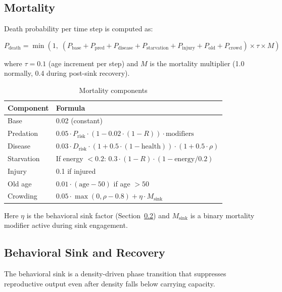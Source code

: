 \subsection{Mortality}
\label{sec:mortality}

Death probability per time step is computed as:

\begin{equation}
P_{\text{death}} = \min\left(1,\; (P_{\text{base}} + P_{\text{pred}} + P_{\text{disease}} + P_{\text{starvation}} + P_{\text{injury}} + P_{\text{old}} + P_{\text{crowd}}) \times \tau \times M\right)
\label{eq:mortality}
\end{equation}

where $\tau = 0.1$ (age increment per step) and $M$ is the mortality multiplier (1.0 normally, 0.4 during post-sink recovery).

\begin{table}[h]
\centering
\caption{Mortality components}
\label{tab:mortality}
\begin{tabular}{ll}
\toprule
Component & Formula \\
\midrule
Base & 0.02 (constant) \\
Predation & $0.05 \cdot P_{\text{risk}} \cdot (1 - 0.02 \cdot (1-R)) \cdot \text{modifiers}$ \\
Disease & $0.03 \cdot D_{\text{risk}} \cdot (1 + 0.5 \cdot (1 - \text{health})) \cdot (1 + 0.5 \cdot \rho)$ \\
Starvation & If energy $< 0.2$: $0.3 \cdot (1-R) \cdot (1 - \text{energy}/0.2)$ \\
Injury & 0.1 if injured \\
Old age & $0.01 \cdot (\text{age} - 50)$ if age $> 50$ \\
Crowding & $0.05 \cdot \max(0, \rho - 0.8) + \eta \cdot M_{\text{sink}}$ \\
\bottomrule
\end{tabular}
\end{table}

Here $\eta$ is the behavioral sink factor (Section~\ref{sec:sink}) and $M_{\text{sink}}$ is a binary mortality modifier active during sink engagement.

\subsection{Behavioral Sink and Recovery}
\label{sec:sink}

The behavioral sink is a density-driven phase transition that suppresses reproductive output even after density falls below carrying capacity.

